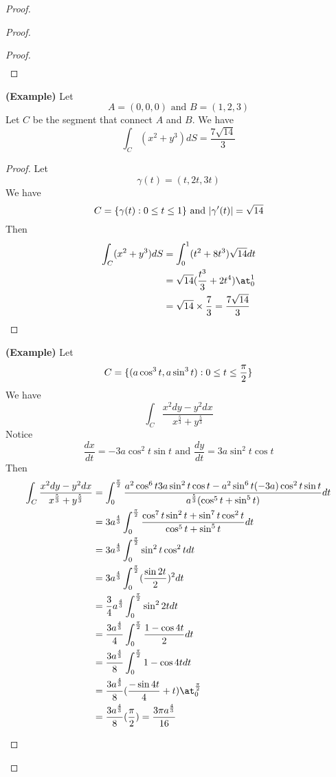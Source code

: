 \documentclass{report}
\begin{document}
\begin{proof}
\begin{proof}
\begin{proof}
\begin{align}
\end{align}
\end{proof}
\begin{theorem}
\textbf{(Example)} Let 
\begin{equation}
A=(0,0,0)\text{ and }B=(1,2,3)
\end{equation}
Let $C$ be the segment that connect  $A$ and  $B$. We have
\begin{equation}
\int_C (x^2+y^3)dS=\frac{7\sqrt{14} }{3}
\end{equation}
\end{theorem}
\begin{proof}
Let 
\begin{equation}
\gamma (t)=(t,2t,3t)
\end{equation}
We have
\begin{equation}
C=\{ \gamma (t):0\leq t\leq 1 \}\text{ and }|\gamma '(t)|=\sqrt{14} 
\end{equation}
Then
\begin{align}
\int_C (x^2+y^3)dS&=\int_0^1 (t^2+8t^3)\sqrt{14}dt\\
&=\sqrt{14}(\frac{t^3}{3}+2t^4) \at_{0}^1\\
&=\sqrt{14} \times \frac{7}{3} =\frac{7\sqrt{14} }{3}
\end{align}
\end{proof}
\begin{theorem}
\textbf{(Example)} Let
\begin{equation}
C=\{ (a\cos^3 t,a\sin^3 t):0\leq t\leq \frac{\pi}{2} \}
\end{equation}
We have
\begin{equation}
\int_C \frac{x^2dy-y^2dx }{x^{\frac{5}{3}}+y^{\frac{5}{3}}}
\end{equation}
Notice
\begin{equation}
\frac{dx}{dt}=-3a\cos^2 t \sin t\text{ and }\frac{dy}{dt}=3a\sin^2 t\cos t
\end{equation}
Then
\begin{align}
  \int_C \frac{x^2dy-y^2dx}{x^{\frac{5}{3}}+y^{\frac{5}{3}}}&=\int_0^{\frac{\pi}{2}}\frac{a^2\cos^6 t 3a \sin^2 t \cos t-a^2 \sin^6 t (-3a)\cos ^2 t \sin t}{a^{\frac{5}{3}}(\cos^5 t+\sin^5 t)}dt\\
  &=3a^{\frac{4}{3}}\int_0^{\frac{\pi}{2}} \frac{\cos^7 t \sin^2 t+ \sin^7 t \cos^2 t}{\cos^5 t+ \sin^5 t}dt\\
  &=3a^{\frac{4}{3}}\int_0^{\frac{\pi}{2}}\sin^2 t \cos^2 t dt\\
  &=3a^{\frac{4}{3}}\int_0^{\frac{\pi}{2}} (\frac{\sin 2t}{2})^2 dt\\
  &=\frac{3}{4}a^{\frac{4}{3}}\int_0^{\frac{\pi}{2}} \sin^2 2t dt\\
  &=\frac{3a^{\frac{4}{3}}}{4}\int_0^{\frac{\pi}{2}} \frac{1-\cos 4t}{2}dt\\
  &=\frac{3a^{\frac{4}{3}}}{8}\int_0^{\frac{\pi}{2}} 1-\cos 4t dt\\
  &=\frac{3a^{\frac{4}{3}}}{8} (\frac{-\sin 4t}{4}+t)\at_{0}^{\frac{\pi}{2}}\\
  &=\frac{3a^{\frac{4}{3}}}{8}(\frac{\pi}{2})=\frac{3\pi a^{\frac{4}{3}}}{16}
\end{align}


\end{theorem}
\end{proof}
\end{proof}
\end{document}

